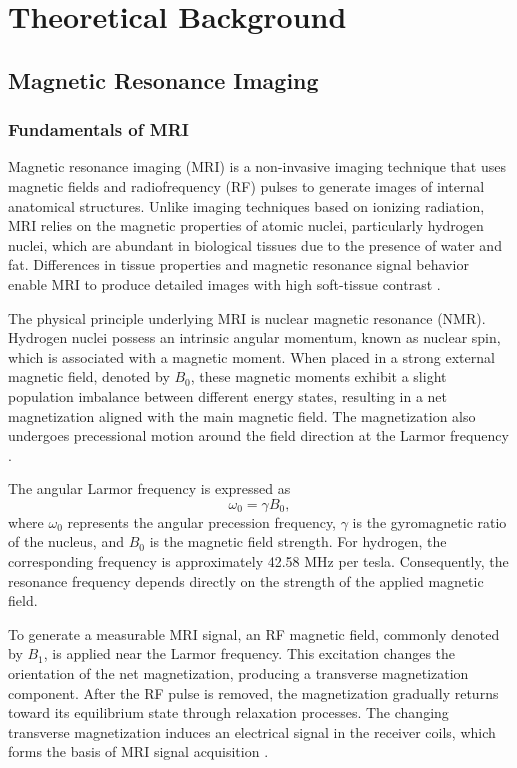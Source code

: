 \chapter{Theoretical Background}
\section{Magnetic Resonance Imaging}
\subsection{Fundamentals of MRI}

Magnetic resonance imaging (MRI) is a non-invasive imaging technique that uses magnetic fields and radiofrequency (RF) pulses to generate images of internal anatomical structures. Unlike imaging techniques based on ionizing radiation, MRI relies on the magnetic properties of atomic nuclei, particularly hydrogen nuclei, which are abundant in biological tissues due to the presence of water and fat. Differences in tissue properties and magnetic resonance signal behavior enable MRI to produce detailed images with high soft-tissue contrast \autocite{plewes2012physics}.

The physical principle underlying MRI is nuclear magnetic resonance (NMR). Hydrogen nuclei possess an intrinsic angular momentum, known as nuclear spin, which is associated with a magnetic moment. When placed in a strong external magnetic field, denoted by $B_0$, these magnetic moments exhibit a slight population imbalance between different energy states, resulting in a net magnetization aligned with the main magnetic field. The magnetization also undergoes precessional motion around the field direction at the Larmor frequency \autocite{bloch1946nuclear,plewes2012physics}.

The angular Larmor frequency is expressed as
\begin{equation}
\omega_0 = \gamma B_0,
\end{equation}
where $\omega_0$ represents the angular precession frequency, $\gamma$ is the gyromagnetic ratio of the nucleus, and $B_0$ is the magnetic field strength. For hydrogen, the corresponding frequency is approximately 42.58 MHz per tesla. Consequently, the resonance frequency depends directly on the strength of the applied magnetic field.

To generate a measurable MRI signal, an RF magnetic field, commonly denoted by $B_1$, is applied near the Larmor frequency. This excitation changes the orientation of the net magnetization, producing a transverse magnetization component. After the RF pulse is removed, the magnetization gradually returns toward its equilibrium state through relaxation processes. The changing transverse magnetization induces an electrical signal in the receiver coils, which forms the basis of MRI signal acquisition \autocite{plewes2012physics}.

